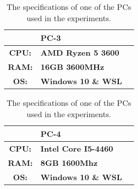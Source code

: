 \begin{table}[htb!]
    \centering
    \begin{tabular}{cp{}p{}}
        \toprule
        \textbf{} & \textbf{PC-3} \\
        \midrule
        \textbf{CPU:} & \textbf{AMD Ryzen 5 3600} \\
        \textbf{RAM:} & \textbf{16GB 3600MHz} \\
        \textbf{OS:} & \textbf{Windows 10 \& WSL} \\
        \bottomrule
    \end{tabular}
    \caption{The specifications of one of the PCs used in the experiments.}
    \label{tab:pc3-specs}
\end{table}

\begin{table}[htb!]
    \centering
    \begin{tabular}{cp{}p{}}
        \toprule
        \textbf{} & \textbf{PC-4} \\
        \midrule
        \textbf{CPU:} & \textbf{Intel Core I5-4460} \\
        \textbf{RAM:} & \textbf{8GB 1600Mhz} \\
        \textbf{OS:} & \textbf{Windows 10 \& WSL} \\
        \bottomrule
    \end{tabular}
    \caption{The specifications of one of the PCs used in the experiments.}
    \label{tab:pc4-specs}
\end{table}
